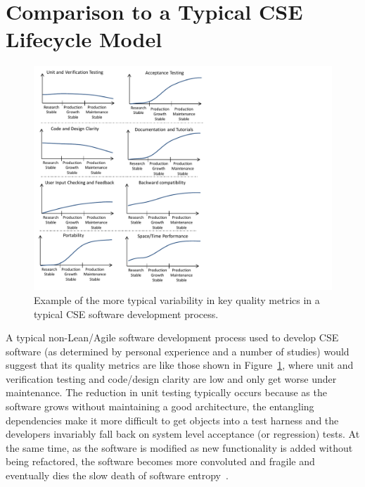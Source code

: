 \documentclass[11pt]{SANDreport}
\begin{document}
%
\section{Comparison to a Typical CSE Lifecycle Model}
\label{sec:compare_with_typical_CSE_model}
%

\begin{figure}
\begin{center}
\includegraphics[trim = 0.1in 0.1in 4.0in 0.1in, scale=0.85]
{TypicalNonAgileSoftwarePhases}
{}\caption{Example of the more typical variability in key quality
metrics in a typical CSE software development process.}
\label{fig:TypicalNonAgileSoftwarePhases}
\end{center}
\end{figure}

A typical non-Lean/Agile software development process used to develop
CSE software (as determined by personal experience and a number of
studies) would suggest that its quality metrics are like those shown
in Figure~\ref{fig:TypicalNonAgileSoftwarePhases}, where unit and
verification testing and code/design clarity are low and only get
worse under maintenance.  The reduction in unit testing typically
occurs because as the software grows without maintaining a good
architecture, the entangling dependencies make it more
difficult to get objects into a test harness and the developers
invariably fall back on system level acceptance (or regression) tests.
At the same time, as the software is modified as new functionality is
added without being refactored, the software becomes more convoluted
and fragile and eventually dies the slow death of software
entropy~\cite{MythicalManMonth95}.
\end{document}
